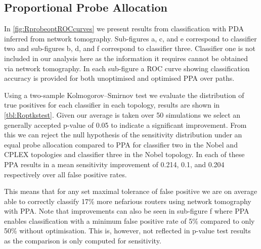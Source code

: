 \subsection{Proportional Probe Allocation}
\label{ssec:Rprobeallocation}
In \cref{fig:RprobeoptROCcurves} we present results from classification with PDA inferred from network tomography. Sub-figures a, c, and e correspond to classifier two and sub-figures b, d, and f correspond to classifier three. Classifier one is not included in our analysis here as the information it requires cannot be obtained via network tomography. In each sub-figure a ROC curve showing classification accuracy is provided for both unoptimised and optimised PPA over paths.\par
Using a two-sample Kolmogorov–Smirnov test we evaluate the distribution of true positives for each classifier in each topology, results are shown in \cref{tbl:Roptkstest}. Given our average is taken over 50 simulations we select an generally accepted p-value of 0.05 to indicate a significant improvement. From this we can reject the null hypothesis of the sensitivity distribution under an equal probe allocation compared to PPA for classifier two in the Nobel and CPLEX topologies and classifier three in the Nobel topology. In each of these PPA results in a mean sensitivity improvement of 0.214, 0.1, and 0.204 respectively over all false positive rates.\par
This means that for any set maximal tolerance of false positive we are on average able to correctly classify 17\% more nefarious routers using network tomography with PPA. Note that improvements can also be seen in sub-figure f where PPA enables classification with a minimum false positive rate of 5\% compared to only 50\% without optimisation. This is, however, not reflected in p-value test results as the comparison is only computed for sensitivity.\par
\noindent
